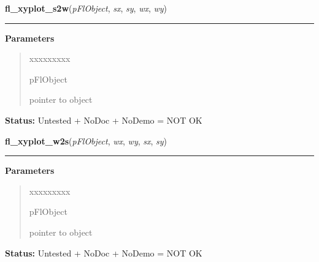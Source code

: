 \hspace{.8\funcindent}\begin{boxedminipage}{\funcwidth}

    \raggedright \textbf{fl\_xyplot\_s2w}(\textit{pFlObject}, \textit{sx}, \textit{sy}, \textit{wx}, \textit{wy})

    \vspace{-1.5ex}

    \rule{\textwidth}{0.5\fboxrule}
\setlength{\parskip}{2ex}
\setlength{\parskip}{1ex}
      \textbf{Parameters}
      \vspace{-1ex}

      \begin{quote}
        \begin{Ventry}{xxxxxxxxx}

          \item[pFlObject]

          pointer to object

        \end{Ventry}

      \end{quote}

\textbf{Status:} Untested + NoDoc + NoDemo = NOT OK



    \end{boxedminipage}

    \label{xformslib:flxyplot:fl_xyplot_w2s}

    \vspace{0.5ex}

\hspace{.8\funcindent}\begin{boxedminipage}{\funcwidth}

    \raggedright \textbf{fl\_xyplot\_w2s}(\textit{pFlObject}, \textit{wx}, \textit{wy}, \textit{sx}, \textit{sy})

    \vspace{-1.5ex}

    \rule{\textwidth}{0.5\fboxrule}
\setlength{\parskip}{2ex}
\setlength{\parskip}{1ex}
      \textbf{Parameters}
      \vspace{-1ex}

      \begin{quote}
        \begin{Ventry}{xxxxxxxxx}

          \item[pFlObject]

          pointer to object

        \end{Ventry}

      \end{quote}

\textbf{Status:} Untested + NoDoc + NoDemo = NOT OK



    \end{boxedminipage}

